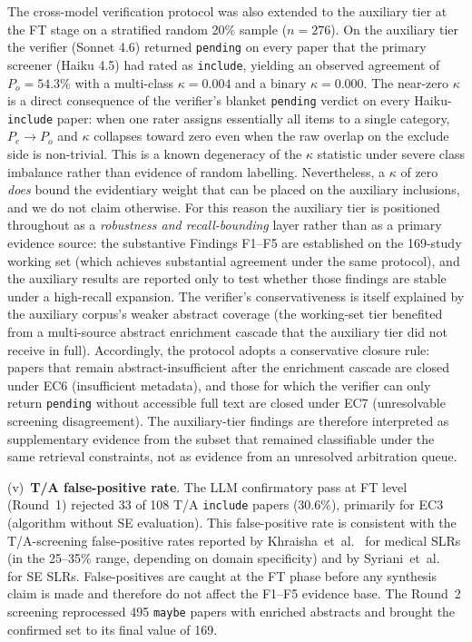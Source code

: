 The cross-model verification protocol was also extended to the auxiliary
tier at the FT stage on a stratified random 20\% sample ($n = 276$). On the auxiliary tier the verifier (Sonnet 4.6)
returned \texttt{pending} on every paper that the primary screener
(Haiku 4.5) had rated as \texttt{include}, yielding an observed agreement of
$P_o = 54.3\%$ with a multi-class $\kappa = 0.004$ and a binary
$\kappa = 0.000$. The near-zero $\kappa$ is a direct consequence of the
verifier's blanket \texttt{pending} verdict on every Haiku-\texttt{include}
paper: when one rater assigns essentially all items to a single category,
$P_e \to P_o$ and $\kappa$ collapses toward zero even when the raw
overlap on the exclude side is non-trivial. This is a known degeneracy of
the $\kappa$ statistic under severe class imbalance rather than evidence of
random labelling. Nevertheless, a $\kappa$ of zero \emph{does} bound the
evidentiary weight that can be placed on the auxiliary inclusions, and we do
not claim otherwise. For this reason the auxiliary tier is positioned
throughout as a \emph{robustness and recall-bounding} layer rather than as a
primary evidence source: the substantive Findings F1--F5 are established on
the 169-study working set (which achieves substantial agreement under the
same protocol), and the auxiliary results are reported only to test whether
those findings are stable under a high-recall expansion. The verifier's
conservativeness is itself explained by the auxiliary corpus's weaker
abstract coverage (the working-set tier benefited from a multi-source
abstract enrichment cascade that the auxiliary tier did not receive in
full). Accordingly, the protocol adopts a conservative closure rule: papers
that remain abstract-insufficient after the enrichment cascade are closed
under EC6 (insufficient metadata), and those for which the verifier can only
return \texttt{pending} without accessible full text are closed under EC7
(unresolvable screening disagreement). The auxiliary-tier findings are therefore
interpreted as supplementary evidence from the subset that remained
classifiable under the same retrieval constraints, not as evidence from an
unresolved arbitration queue.



(v)~\textbf{T/A false-positive rate}.
The LLM confirmatory pass at FT level (Round~1) rejected 33 of 108 T/A
\texttt{include} papers (30.6\%), primarily for EC3 (algorithm without SE
evaluation). This false-positive rate is consistent with the
T/A-screening false-positive rates reported by Khraisha~et~al.\
\cite{khraisha2024} for medical SLRs (in the 25--35\% range, depending on
domain specificity) and by Syriani~et~al.~\cite{syriani2023} for SE
SLRs. False-positives are caught at the FT phase before any synthesis claim
is made and therefore do not affect the F1--F5 evidence base. The Round~2
screening reprocessed 495 \texttt{maybe} papers with enriched abstracts and
brought the confirmed set to its final value of 169.

